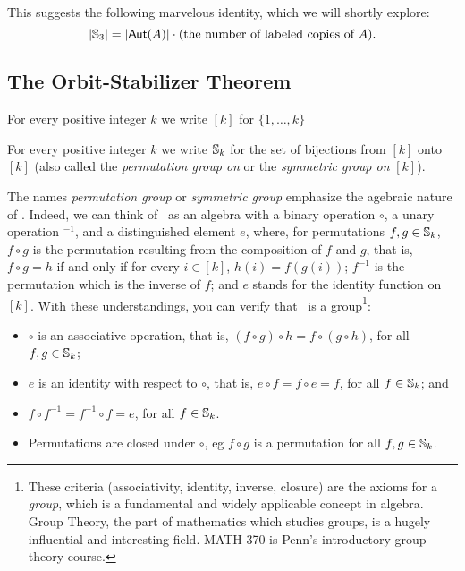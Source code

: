 This suggests the following marvelous identity, which we will shortly explore:
\begin{equation}\label{ose-eq}
\mbox{$|\mbox{$\mathbb{S}_{3}$}|$}=\mbox{$|\mbox{$\mathsf{Aut}(A)$}|$}\cdot (\mbox{the number of labeled copies of }A).
\end{equation}

\subsection*{The Orbit-Stabilizer Theorem}

\begin{definition}
For every positive integer $k$ we write $[k]$ for $\{1,\ldots,k\}$
\end{definition}

\begin{definition}
For every positive integer $k$ we write $\mbox{$\mathbb{S}_{k}$}$ for the set of bijections from $[k]$ onto $[k]$ (also called the \emph{permutation group on} or the \emph{symmetric group on} $[k]$).
\end{definition}

The names \emph{permutation group} or \emph{symmetric group} emphasize the agebraic nature of . Indeed, we can think of \ as an algebra with a binary operation $\circ$, a unary operation $^{-1}$, and a distinguished element $e$, where, for permutations $f,g\in\mbox{$\mathbb{S}_{k}$}$, $f\circ g$ is the permutation resulting from the composition of $f$ and $g$, that is, $f\circ g =h$ if and only if for every $i\in [k]$, $h(i) = f(g(i))$; $f^{-1}$ is the permutation which is the inverse of $f$; and $e$ stands for the identity function on $[k]$. With these understandings, you can verify that \ is a group\footnote{These criteria (associativity, identity, inverse, closure) are the axioms for a \emph{group}, which is a fundamental and widely applicable concept in algebra. Group Theory, the part of mathematics which studies groups, is a hugely influential and interesting field. MATH 370 is Penn's introductory group theory course. }: 

\begin{itemize}
\item   
$\circ$ is an associative operation, that is, $(f\circ g)\circ h= f\circ (g\circ h)$, for all $f,g\in\mbox{$\mathbb{S}_{k}$}$;
\item
 $e$ is an identity with respect to $\circ$, that is, $e\circ f = f\circ e = f$, for all $f\in\mbox{$\mathbb{S}_{k}$}$; and 
 \item
 $f\circ f^{-1} = f^{-1}\circ f = e$, for all $f\in\mbox{$\mathbb{S}_{k}$}$.
 \item Permutations are closed under $\circ$, eg $f \circ g$ is a permutation for all $f, g \in \mbox{$\mathbb{S}_{k}$}$. 
\end{itemize} 

